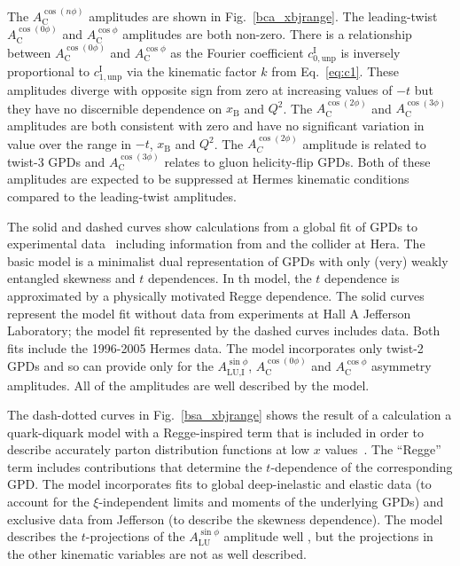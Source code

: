 The $A_{\textrm{C}}^{\cos(n\phi)}$ amplitudes are shown in Fig.~\ref{bca_xbjrange}. The leading-twist $A_{\textrm{C}}^{\cos(0\phi)}$ and $A_{\textrm{C}}^{\cos\phi}$ amplitudes are both non-zero. There is a relationship between $A_{\textrm{C}}^{\cos(0\phi)}$ and $A_{\textrm{C}}^{\cos\phi}$ as the Fourier coefficient $c^{\textrm{I}}_{0,\textrm{unp}}$ is inversely proportional to $c^{\textrm{I}}_{1,\textrm{unp}}$ via the kinematic factor $k$ from Eq.~\ref{eq:c1}. These amplitudes diverge with opposite sign from zero at increasing values of $-t$ but they
have no discernible dependence on $x_{\textrm{B}}$ and $Q^{2}$. The $A_{\textrm{C}}^{\cos(2\phi)}$ and $A_{\textrm{C}}^{\cos(3\phi)}$ amplitudes are both consistent with zero and have no significant variation in value over the range in $-t$, $x_{\textrm{B}}$ and $Q^{2}$. The $A_{C}^{\cos(2\phi)}$ amplitude is related to twist-3 GPDs and $A_{\textrm{C}}^{\cos(3\phi)}$ relates to gluon helicity-flip GPDs. Both of these amplitudes are expected to be suppressed at H{\sc ermes} kinematic conditions compared to the leading-twist amplitudes. 

 The solid and dashed curves show calculations from a global fit of GPDs to experimental data~\cite{Kum09} including information from  and the collider  at H{\sc era}. The basic model is a minimalist dual representation of GPDs with only (very) weakly entangled skewness and $t$ dependences. In th model, the $t$ dependence is approximated by a physically motivated Regge dependence. The solid curves represent the model fit without data from experiments \cite{Cam06, Gir08} at Hall A  Jefferson Laboratory; the model fit represented by the dashed curves includes  data. Both fits include the 1996-2005 H{\sc ermes} data. The model incorporates only twist-2 GPDs and so can provide  only for the $A_{\textrm{LU,I}}^{\sin\phi}$, $A_{\textrm{C}}^{\cos(0\phi)}$ and $A_{\textrm{C}}^{\cos\phi}$ asymmetry amplitudes. All of the amplitudes are well described by the model.

The dash-dotted curves in Fig.~\ref{bsa_xbjrange} shows the result of a calculation  a quark-diquark model with a Regge-inspired term that is included in order to describe accurately parton distribution functions at low $x$ values~\cite{Liu11}. The ``Regge'' term includes contributions that determine the $t$-dependence of the corresponding GPD. The model incorporates fits to global deep-inelastic and elastic  data (to account for the $\xi$-independent limits and moments of the underlying GPDs) and exclusive data from Jefferson  (to describe the skewness dependence). The model describes the $t$-projections of the $A^{\sin\phi}_{\textrm{LU}}$ amplitude well , but the projections in the other kinematic variables are not as well described.

